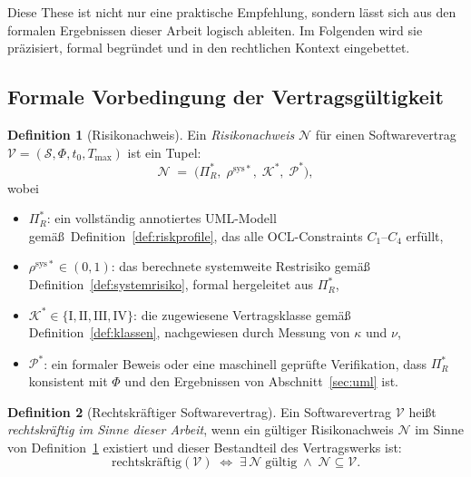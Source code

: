 ﻿\documentclass[a4paper,12pt]{article}
\theoremstyle{definition}
\newtheorem{definition}{Definition}
\begin{document}
Diese These ist nicht nur eine praktische Empfehlung, sondern l\"asst sich aus den
formalen Ergebnissen dieser Arbeit logisch ableiten. Im Folgenden wird sie pr\"azisiert,
formal begr\"undet und in den rechtlichen Kontext eingebettet.

\subsection{Formale Vorbedingung der Vertragsg\"ultigkeit}

\begin{definition}[Risikonachweis]
\label{def:risikonachweis}
    Ein \emph{Risikonachweis} $\mathcal{N}$ f\"ur einen Softwarevertrag
    $\mathcal{V} = (\mathcal{S}, \Phi, t_0, T_{\max})$ ist ein Tupel:
    \[
        \mathcal{N} \;=\; \bigl(\Pi_R^*,\; \rho^{\mathrm{sys}*},\;
                               \mathcal{K}^*,\; \mathcal{P}^*\bigr),
    \]
    wobei
    \begin{itemize}
        \item $\Pi_R^*$: ein vollst\"andig annotiertes UML-Modell gem\"a\ss{}\
              Definition~\ref{def:riskprofile}, das alle OCL-Constraints $C_1$--$C_4$
              erf\"ullt,
        \item $\rho^{\mathrm{sys}*} \in (0,1)$: das berechnete systemweite Restrisiko
              gem\"a\ss{} Definition~\ref{def:systemrisiko}, formal hergeleitet aus
              $\Pi_R^*$,
        \item $\mathcal{K}^* \in \{\mathrm{I, II, III, IV}\}$: die zugewiesene
              Vertragsklasse gem\"a\ss{} Definition~\ref{def:klassen}, nachgewiesen
              durch Messung von $\kappa$ und $\nu$,
        \item $\mathcal{P}^*$: ein formaler Beweis oder eine maschinell gepr\"ufte
              Verifikation, dass $\Pi_R^*$ konsistent mit $\Phi$ und den Ergebnissen
              von Abschnitt~\ref{sec:uml} ist.
    \end{itemize}
\end{definition}

\begin{definition}[Rechtskr\"aftiger Softwarevertrag]
\label{def:rechtskraeftig}
    Ein Softwarevertrag $\mathcal{V}$ hei\ss{}t \emph{rechtskr\"aftig im Sinne dieser
    Arbeit}, wenn ein g\"ultiger Risikonachweis $\mathcal{N}$ im Sinne von
    Definition~\ref{def:risikonachweis} existiert und dieser Bestandteil des
    Vertragswerks ist:
    \[
        \text{rechtskr\"aftig}(\mathcal{V}) \;\Longleftrightarrow\;
        \exists\, \mathcal{N} \;\text{g\"ultig} \;\wedge\;
        \mathcal{N} \subseteq \mathcal{V}.
    \]
\end{definition}
\end{document}
